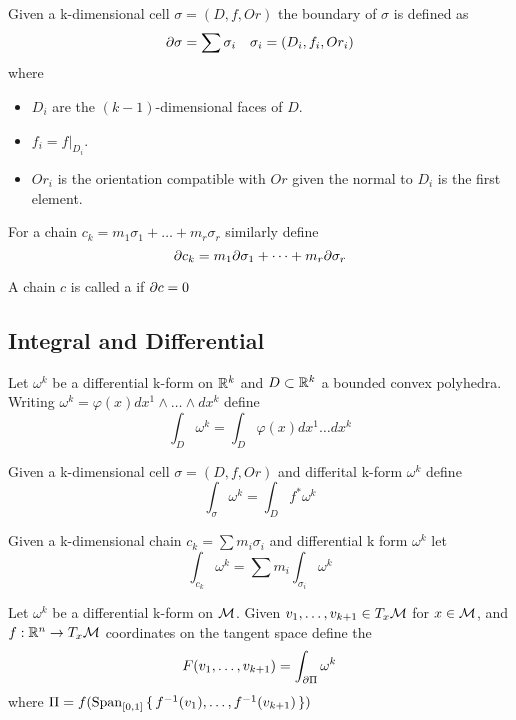 \documentclass{article}
\begin{document}
\begin{definition}[Boundary]
Given a k-dimensional cell $\sigma=(D,f,Or)$ the boundary of $\sigma$ is defined as 
\[
\partial \sigma = \sum \sigma_i \quad  \sigma_i = (D_i, f_i, Or_i)
\]
where 
\begin{itemize}
    \item $D_i$ are the $(k-1)$-dimensional faces of $D$. 
    \item $f_i = f\rvert_{D_i}$.
    \item $Or_i$ is the orientation compatible with $Or$ given the normal to $D_i$ is the first element. 
\end{itemize}
For a chain $c_k = m_1 \sigma_1 + \dots + m_r \sigma_r$ similarly define 
\[
\partial c_k = m_1 \partial\sigma_1 + \dots + m_r \partial\sigma_r
\]
\end{definition}

\begin{definition}[Cycle]
A chain $c$ is called a  if $\partial c =0$
\end{definition}

\subsection{Integral and Differential}

\begin{definition}
Let $\omega^k$ be a differential k-form on $\mathbb{R}^k$ and $D\subset \mathbb{R}^k$ a bounded convex polyhedra. Writing $\omega^k = \varphi(x) dx^1 \wedge \dots \wedge dx^k $ define 
\[
\int_D \omega^k = \int_D \varphi(x) dx^1\dots dx^k
\]
\end{definition}

\begin{definition}
Given a k-dimensional cell $\sigma=(D,f,Or)$ and differital k-form $\omega^k$ define 
\[
\int_\sigma \omega^k = \int_D f^\ast \omega^k 
\]
\end{definition}

\begin{definition}
Given a k-dimensional chain $c_k = \sum m_i \sigma_i $ and differential k form $\omega^k$ let 
\[
\int_{c_k} \omega^k = \sum m_i \int_{\sigma_i} \omega^k 
\]
\end{definition}

\begin{definition}[Increment]
Let $\omega^k$ be a differential k-form on $\mathcal{M}$. Given $v_1, \dots, v_{k+1} \in T_x \mathcal{M}$ for $x\in\mathcal{M}$, and $f:\mathbb{R}^n \to T_x\mathcal{M}$ coordinates on the tangent space define the  
\[
F(v_1, \dots, v_{k+1}) = \int_{\partial\Pi} \omega^k
\]
where $\Pi = f(\operatorname{Span}_{[0,1]}\set{f^{-1}(v_1),\dots,f^{-1}(v_{k+1})})$
\end{definition}
\end{document}
